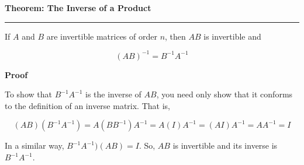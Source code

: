 \nopagenumbers
{\bf Theorem: The Inverse of a Product}
\vskip 1mm
\hrule

\vskip 6pt
If $A$ and $B$ are invertible matrices of order $n$, then $AB$ is invertible and

$$(AB)^{-1}=B^{-1}A^{-1}$$

\vskip 10pt
{\bf Proof}

\vskip 6pt
To show that $B^{-1}A^{-1}$ is the inverse of $AB$, you need only show that it conforms to the definition of an inverse matrix. That is,

$$(AB)(B^{-1}A^{-1})=A(BB^{-1})A^{-1}=A(I)A^{-1}=(AI)A^{-1}=AA^{-1}=I$$

In a similar way, $B^{-1}A^{-1})(AB)=I$. So, $AB$ is invertible and its inverse is $B^{-1}A^{-1}$.


\vfill\eject
\bye
